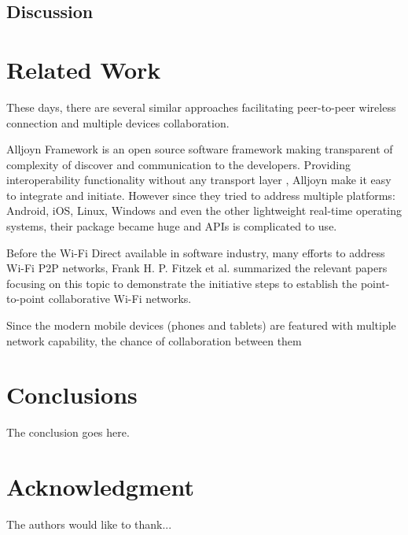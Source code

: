 \documentclass[conference]{IEEEtran}
\begin{document}
\subsection{Discussion}

\section{Related Work}
These days, there are several similar approaches facilitating peer-to-peer wireless connection and multiple devices collaboration. 

Alljoyn Framework \cite{alljoyn} is an open source software framework making transparent of complexity of discover and communication to the developers. Providing interoperability functionality without any transport layer , Alljoyn make it easy to integrate and initiate. However since they tried to address multiple platforms: Android, iOS, Linux, Windows and even the other lightweight real-time operating systems, their package became huge and APIs is complicated to use. 

Before the Wi-Fi Direct available in software industry, many efforts to address Wi-Fi P2P networks, Frank H. P. Fitzek et al. \cite{m_p2p_tutor} summarized the relevant papers focusing on this topic to demonstrate the initiative steps to establish the point-to-point collaborative Wi-Fi networks. 

Since the modern mobile devices (phones and tablets) are featured with multiple network capability, the chance of collaboration between them 

\label{sec:related}

\section{Conclusions}
\label{sec:conc}
The conclusion goes here.






\section*{Acknowledgment}


The authors would like to thank...





\end{document}
